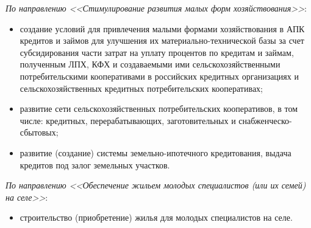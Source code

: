 \documentclass[article, 12pt, russian, oneside]{ncc}
\begin{document}
\emph{По направлению <<Стимулирование развития малых форм
  хозяйствования>>}:

\begin{itemize}
\item создание условий для привлечения малыми формами хозяйствования в
  АПК кредитов и займов для улучшения их материально-технической базы
  за счет субсидирования части затрат на уплату процентов по кредитам
  и займам, полученным ЛПХ, КФХ и создаваемыми ими
  сельскохозяйственными потребительскими кооперативами в российских
  кредитных организациях и сельскохозяйственных кредитных
  потребительских кооперативах;
\item развитие сети сельскохозяйственных потребительских кооперативов,
  в том числе: кредитных, перерабатывающих, заготовительных и
  снабженческо-сбытовых;
\item развитие (создание) системы земельно-ипотечного кредитования,
  выдача кредитов под залог земельных участков.
\end{itemize}

\emph{По направлению <<Обеспечение жильем молодых специалистов (или их
  семей) на селе>>}:

\begin{itemize}
\item строительство (приобретение) жилья для молодых специалистов на
  селе.
\end{itemize}


\end{document}
